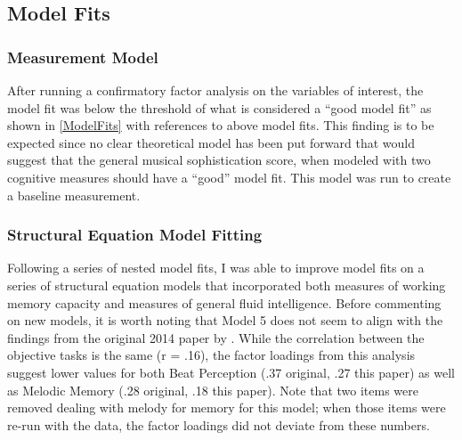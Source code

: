 \documentclass[12pt,]{book}
\begin{document}
\hypertarget{model-fits}{%
\subsection{Model Fits}\label{model-fits}}

\hypertarget{measurement-model-1}{%
\subsubsection{Measurement Model}\label{measurement-model-1}}

After running a confirmatory factor analysis on the variables of interest, the model fit was below the threshold of what is considered a ``good model fit'' as shown in \ref{ModelFits} with references to above model fits.
This finding is to be expected since no clear theoretical model has been put forward that would suggest that the general musical sophistication score, when modeled with two cognitive measures should have a ``good'' model fit.
This model was run to create a baseline measurement.

\hypertarget{structural-equation-model-fitting}{%
\subsubsection{Structural Equation Model Fitting}\label{structural-equation-model-fitting}}

Following a series of nested model fits, I was able to improve model fits on a series of structural equation models that incorporated both measures of working memory capacity and measures of general fluid intelligence.
Before commenting on new models, it is worth noting that Model 5 does not seem to align with the findings from the original 2014 paper by \citep{mullensiefenMusicalityNonMusiciansIndex2014}.
While the correlation between the objective tasks is the same (r = .16), the factor loadings from this analysis suggest lower values for both Beat Perception (.37 original, .27 this paper) as well as Melodic Memory (.28 original, .18 this paper).
Note that two items were removed dealing with melody for memory for this model; when those items were re-run with the data, the factor loadings did not deviate from these numbers.
\end{document}
